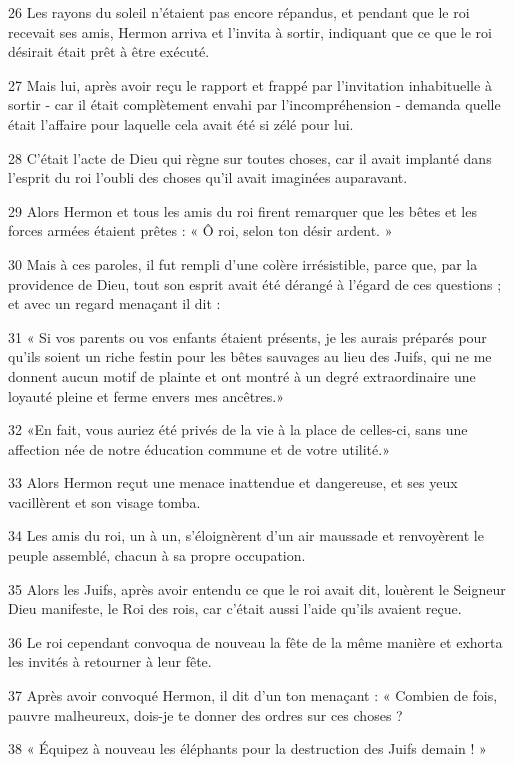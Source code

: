 \par 26 Les rayons du soleil n'étaient pas encore répandus, et pendant que le roi recevait ses amis, Hermon arriva et l'invita à sortir, indiquant que ce que le roi désirait était prêt à être exécuté.
\par 27 Mais lui, après avoir reçu le rapport et frappé par l'invitation inhabituelle à sortir - car il était complètement envahi par l'incompréhension - demanda quelle était l'affaire pour laquelle cela avait été si zélé pour lui.
\par 28 C'était l'acte de Dieu qui règne sur toutes choses, car il avait implanté dans l'esprit du roi l'oubli des choses qu'il avait imaginées auparavant.
\par 29 Alors Hermon et tous les amis du roi firent remarquer que les bêtes et les forces armées étaient prêtes : « Ô roi, selon ton désir ardent. »
\par 30 Mais à ces paroles, il fut rempli d'une colère irrésistible, parce que, par la providence de Dieu, tout son esprit avait été dérangé à l'égard de ces questions ; et avec un regard menaçant il dit :
\par 31 « Si vos parents ou vos enfants étaient présents, je les aurais préparés pour qu'ils soient un riche festin pour les bêtes sauvages au lieu des Juifs, qui ne me donnent aucun motif de plainte et ont montré à un degré extraordinaire une loyauté pleine et ferme envers mes ancêtres.»
\par 32 «En fait, vous auriez été privés de la vie à la place de celles-ci, sans une affection née de notre éducation commune et de votre utilité.»
\par 33 Alors Hermon reçut une menace inattendue et dangereuse, et ses yeux vacillèrent et son visage tomba.
\par 34 Les amis du roi, un à un, s'éloignèrent d'un air maussade et renvoyèrent le peuple assemblé, chacun à sa propre occupation.
\par 35 Alors les Juifs, après avoir entendu ce que le roi avait dit, louèrent le Seigneur Dieu manifeste, le Roi des rois, car c'était aussi l'aide qu'ils avaient reçue.
\par 36 Le roi cependant convoqua de nouveau la fête de la même manière et exhorta les invités à retourner à leur fête.
\par 37 Après avoir convoqué Hermon, il dit d'un ton menaçant : « Combien de fois, pauvre malheureux, dois-je te donner des ordres sur ces choses ?
\par 38 « Équipez à nouveau les éléphants pour la destruction des Juifs demain ! »
